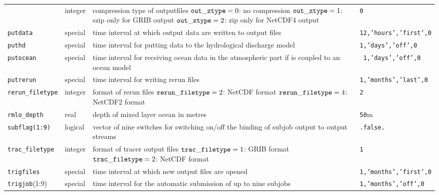 \begin{longtable}{l@{\extracolsep\fill}lp{}p{3.5cm}}
 & integer & compression type of outputfiles\newline
                        ${\tt out\_ztype}=0$: no compression\newline
                        ${\tt out\_ztype}=1$: szip only for GRIB
                        output\newline
                        ${\tt out\_ztype}=2$: zip only for NetCDF4
                        output                                    &
                        {\tt 0} \\
{\tt putdata}\index{namelist variables!putdata}
 & special    & time interval at which output data are written
  to output files & {\tt 12,'hours','first',0} \\
{\tt puthd}\index{namelist variables!puthd}
 & special      & time interval for putting data to the
  hydrological discharge model & {\tt 1,'days','off',0}\\
{\tt putocean}\index{namelist variables!putocean}
 & special   & time interval for receiving ocean data in the
  atmospheric part if \echam{} is coupled to an ocean model & {\tt
    1,'days','off',0} \\
{\tt putrerun}\index{namelist variables!putrerun}
 & special  & time interval for writing rerun files &
  {\tt 1,'months','last',0}\\
{\tt rerun\_filetype}\index{namelist variables!rerun\_filetype}
 &integer & format of rerun files\newline
                        ${\tt rerun\_filetype}=2$: NetCDF format
                        \newline
                        ${\tt rerun\_filetype}=4$: NetCDF2 format &
                        {\tt 2}\\
{\tt rmlo\_depth}\index{namelist variables!rmlo\_depth} & real & depth of
mixed layer ocean in metres & {\tt 50}m \\
{\tt subflag(1:9)}\index{namelist variables!subflag}
 & logical &vector of nine switches for switching on/off the
  binding of subjob output to output streams & {\tt .false.}\\
{\tt trac\_filetype}\index{namelist variables!trac\_filetype}
 &integer  & format of tracer output files \newline
                        ${\tt trac\_filetype}=1$:  GRIB format \newline 
                        ${\tt trac\_filetype}=2$:  NetCDF format &
                        {\tt 1} \\
{\tt trigfiles}\index{namelist variables!trigfiles}
 & special  & time interval at which new output files are
  opened & {\tt 1,'months','first',0} \\
{\tt trigjob}(1:9)\index{namelist variables!trigjob}
 & special    & time interval for the automatic submission of
  up to nine subjobs &{\tt 1,'months','off',0} \\
\hline
\end{longtable}


